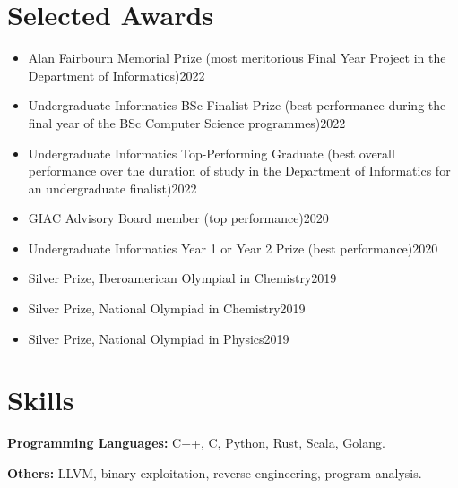 \documentclass{resume}
\begin{document}
\section{Selected Awards}
\begin{itemize}
    \item Alan Fairbourn Memorial Prize (most meritorious Final Year Project in the
    Department of Informatics)\hfill 2022
    \item Undergraduate Informatics BSc Finalist Prize (best performance during the final year of the BSc Computer Science programmes)\hfill 2022
    \item Undergraduate Informatics Top-Performing Graduate (best overall performance over the duration of study in the
    Department of Informatics for an undergraduate finalist)\hfill 2022
    \item GIAC Advisory Board member (top performance)\hfill 2020
    \item Undergraduate Informatics Year 1 or Year 2 Prize (best performance)\hfill 2020
    \item Silver Prize, Iberoamerican Olympiad in Chemistry\hfill 2019
    \item Silver Prize, National Olympiad in Chemistry\hfill 2019
    \item Silver Prize, National Olympiad in Physics\hfill 2019
\end{itemize}




\section{Skills}
\textbf{Programming Languages:} \small C++, C, Python, Rust, Scala, Golang.

\textbf{Others:} \small LLVM, binary exploitation, reverse engineering, program analysis.
\end{document}

